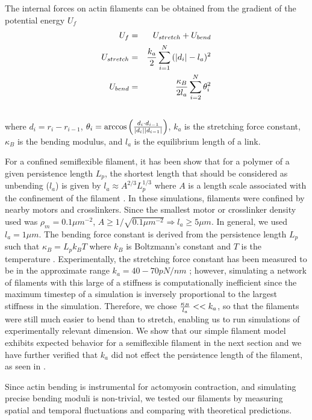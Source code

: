 \documentclass[11pt]{article}
\begin{document}
The internal forces on actin filaments can be obtained from the gradient of the potential energy $U_f$
\begin{eqnarray}
  U_f &=& U_{stretch} + U_{bend}\\
  U_{stretch}&=&{k_a\over2}\sum_{i=1}^{N}{(|d_i| - l_a)^2}\\\nonumber
  U_{bend}&=&{\kappa_B\over 2l_a}\sum_{i=2}^N{\theta_i^2}\\\nonumber
  \label{eqn:Ufil}
\end{eqnarray}
where $d_i = r_i-r_{i-1}$, $\theta_i = \arccos{\left({d_i\cdot d_{i-1}\over |d_i||d_{i-1}|}\right)}$, $k_a$ is the
stretching force constant, $\kappa_B$ is the bending modulus, and $l_a$ is the equilibrium length of a
link. 
\par
For a confined semiflexible filament, it has been show that for a polymer of a given persistence length $L_p$, the shortest length that should be considered as unbending ($l_a$) is given by $l_a\approx A^{2/3}L_p^{1/3}$ where $A$ is a length scale associated with the confinement of the
filament \cite{odijk1983}. In these simulations, filaments were confined by nearby motors and crosslinkers. Since the smallest motor or crosslinker density used was $\rho_m=0.1\mu m^{-2}$, $A\ge1/\sqrt{0.1\mu m^{-2}}\Rightarrow l_a\ge5\mu m$. In general, we used $l_a=1\mu m$.
The bending force constant is derived from the persistence length $L_p$ such that
$\kappa_B = L_p k_B T$ where $k_B$ is Boltzmann's constant and $T$ is the temperature \cite{rubinstein}. Experimentally,
the stretching force constant has been measured to be in the approximate range $k_a=40-70pN/nm$ \cite{kojima1994, higuchi1995}; however, simulating a
network of filaments with this large of a stiffness is computationally inefficient since the maximum timestep of a simulation is inversely proportional to the largest stiffness in the simulation. Therefore, we chose ${\kappa_B\over l_a} <<k_a$, so that the filaments were still much easier to bend than to stretch, enabling us to run simulations of experimentally relevant dimension. We show that our simple filament model exhibits expected behavior for a semiflexible filament in the next section and we have further verified that $k_a$ did not effect the persistence length of the filament, as seen in . 
\par
Since actin bending is instrumental for actomyosin contraction, and simulating precise bending moduli is non-trivial, we tested our filaments by measuring spatial and temporal fluctuations and comparing with theoretical predictions.
\end{document}
